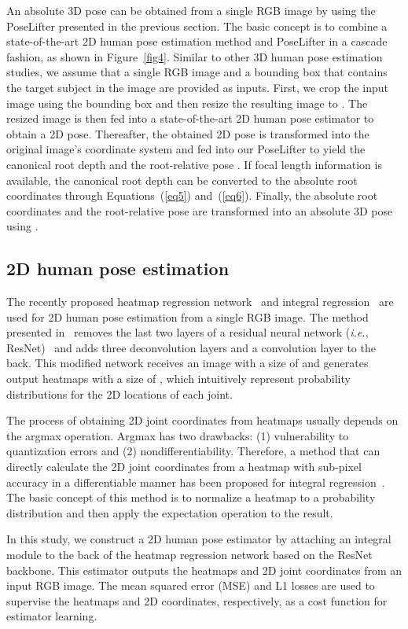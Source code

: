 \documentclass[10pt,twocolumn,letterpaper]{article}
\begin{document}
An absolute 3D pose can be obtained from a single RGB image by using the PoseLifter presented in the previous section. The basic concept is to combine a state-of-the-art 2D human pose estimation method and PoseLifter in a cascade fashion, as shown in Figure~\ref{fig4}. Similar to other 3D human pose estimation studies, we assume that a single RGB image and a bounding box that contains the target subject in the image are provided as inputs. First, we crop the input image using the bounding box and then resize the resulting image to . The resized image is then fed into a state-of-the-art 2D human pose estimator to obtain a 2D pose. Thereafter, the obtained 2D pose is transformed into the original image's coordinate system and fed into our PoseLifter to yield the canonical root depth  and the root-relative pose . If focal length information is available, the canonical root depth can be converted to the absolute root coordinates  through Equations~(\ref{eq5}) and~(\ref{eq6}). Finally, the absolute root coordinates and the root-relative pose are transformed into an absolute 3D pose using .

\subsection{2D human pose estimation}
\label{sec4.1}

The recently proposed heatmap regression network~\cite{Xiao2018} and integral regression~\cite{Sun2018} are used for 2D human pose estimation from a single RGB image. The method presented in~\cite{Xiao2018} removes the last two layers of a residual neural network (\textit{i.e.}, ResNet)~\cite{He2016} and adds three deconvolution layers and a  convolution layer to the back. This modified network receives an image with a size of  and generates output heatmaps with a size of , which intuitively represent probability distributions for the 2D locations of each joint.

The process of obtaining 2D joint coordinates from heatmaps usually depends on the argmax operation. Argmax has two drawbacks: (1) vulnerability to quantization errors and (2) nondifferentiability. Therefore, a method that can directly calculate the 2D joint coordinates from a heatmap with sub-pixel accuracy in a differentiable manner has been proposed for integral regression~\cite{Sun2018}. The basic concept of this method is to normalize a heatmap to a probability distribution and then apply the expectation operation to the result.

In this study, we construct a 2D human pose estimator by attaching an integral module to the back of the heatmap regression network based on the ResNet backbone. This estimator outputs the heatmaps and 2D joint coordinates from an input RGB image. The mean squared error (MSE) and L1 losses are used to supervise the heatmaps and 2D coordinates, respectively, as a cost function for estimator learning.
\end{document}
